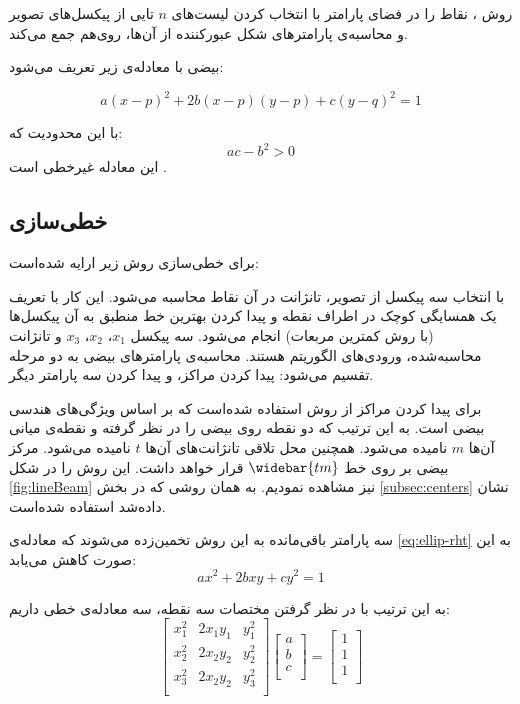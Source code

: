 \documentclass[12pt,a4paper]{article}
\numberwithin{equation}{section}
\numberwithin{figure}{section}
\theoremstyle{definition}
\theoremstyle{theorem}
\theoremstyle{definition}
\begin{document}
روش ، نقاط را در فضای پارامتر با انتخاب کردن لیست‌های 
\( n\)
تایی از پیکسل‌های تصویر و محاسبه‌ی پارامترهای شکل عبورکننده از آن‌ها، روی‌هم جمع می‌کند.

بیضی با معادله‌ی زیر تعریف می‌شود: 

\begin{equation}
a(x-p)^2 + 2b(x-p)(y-p) + c(y-q)^2 = 1
\label{eq:ellip-rht}
\end{equation}

با این محدودیت که:
\begin{equation}
ac - b^2 > 0
\label{eq:const}
\end{equation}
این معادله غیرخطی است \cite{RHT}.

\subsection{خطی‌سازی}

برای خطی‌سازی روش زیر ارایه شده‌است: 

با انتخاب سه پیکسل از تصویر، تانژانت در آن نقاط محاسبه می‌شود. این کار با تعریف یک همسایگی کوچک در اطراف نقطه و پیدا کردن بهترین خط منطبق به آن پیکسل‌ها (با روش کمترین مربعات) انجام می‌شود.
سه پیکسل
\( x_1 \)،
\( x_2 \)،
\( x_3 \)
و تانژانت محاسبه‌شده، ورودی‌های الگوریتم هستند. 
محاسبه‌ی پارامترهای بیضی به دو مرحله تقسیم می‌شود: پیدا کردن مراکز، و پیدا کردن سه پارامتر دیگر. 

برای پیدا کردن مراکز از روش \cite{rht-cent} استفاده شده‌است که بر اساس ویژگی‌های هندسی بیضی است. به این ترتیب که دو نقطه روی بیضی را در نظر گرفته و نقطه‌ی میانی آن‌ها 
\(m\)
نامیده می‌شود. همچنین محل تلاقی تانژانت‌های آن‌ها 
\( t \)
نامیده می‌شود. مرکز بیضی بر روی خط 
\( \widebar{tm} \) 
قرار خواهد داشت. این روش را در شکل \ref{fig:lineBeam} نیز مشاهده نمودیم. به همان روشی که در بخش \ref{subsec:centers} نشان‌ داده‌شد استفاده شده‌است. 

سه پارامتر باقی‌مانده به این روش تخمین‌زده می‌شوند که معادله‌ی \ref{eq:ellip-rht} به این صورت کاهش می‌یابد: 
\begin{equation}
ax^2+2bxy+cy^2 = 1
\label{eq:reduced}
\end{equation}

به این ترتیب با در نظر گرفتن مختصات سه نقطه، سه معادله‌ی خطی داریم:
\begin{equation}
\left[ 
\begin{array}{ccc}
x_1^2 & 2x_1y_1 & y_1^2 \\[0.2cm]
x_2^2 & 2x_2y_2 & y_2^2 \\[0.2cm]
x_3^2 & 2x_2y_2 & y_3^2 \\[0.2cm]
\end{array}
\right]
\left[ 
\begin{array}{ccc}
a \\[0.2cm]
b \\[0.2cm]
c \\[0.2cm]
\end{array}
\right]
=\left[ 
\begin{array}{ccc}
1 \\[0.2cm]
1 \\[0.2cm]
1 \\[0.2cm]
\end{array}
\right]
\label{eq:linear}
\end{equation}
\end{document}
